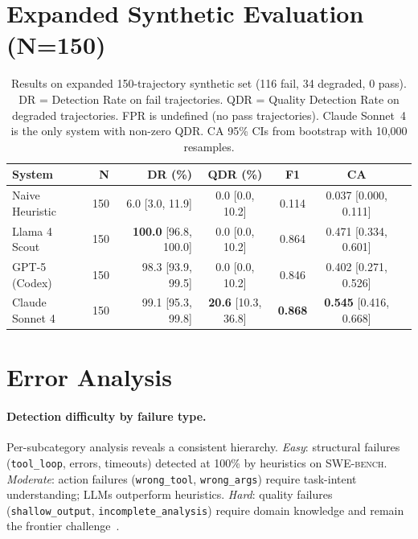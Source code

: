 \documentclass[11pt]{article}
\newcommand{\swebench}{\textsc{SWE-bench}\xspace}
\begin{document}
\section{Expanded Synthetic Evaluation (N=150)}
\label{app:synthetic_150}

\begin{table}[h]
\centering
\caption{Results on expanded 150-trajectory synthetic set (116 fail, 34
degraded, 0 pass). DR = Detection Rate on fail trajectories. QDR =
Quality Detection Rate on degraded trajectories. FPR is undefined (no
pass trajectories). Claude Sonnet~4 is the only system with non-zero QDR.
CA 95\% CIs from bootstrap with 10,000 resamples.}
\label{tab:synthetic_150}
\small
\begin{tabular}{@{}lrrcccl@{}}
\toprule
\textbf{System} & \textbf{N} & \textbf{DR (\%)} & \textbf{QDR (\%)} & \textbf{F1} & \textbf{CA} \\
\midrule
Naive Heuristic & 150 & 6.0 {\scriptsize [3.0, 11.9]} & 0.0 {\scriptsize [0.0, 10.2]} & 0.114 & 0.037 {\scriptsize [0.000, 0.111]} \\
Llama 4 Scout   & 150 & \textbf{100.0} {\scriptsize [96.8, 100.0]} & 0.0 {\scriptsize [0.0, 10.2]} & 0.864 & 0.471 {\scriptsize [0.334, 0.601]} \\
GPT-5 (Codex)   & 150 & 98.3 {\scriptsize [93.9, 99.5]} & 0.0 {\scriptsize [0.0, 10.2]} & 0.846 & 0.402 {\scriptsize [0.271, 0.526]} \\
Claude Sonnet 4 & 150 & 99.1 {\scriptsize [95.3, 99.8]} & \textbf{20.6} {\scriptsize [10.3, 36.8]} & \textbf{0.868} & \textbf{0.545} {\scriptsize [0.416, 0.668]} \\
\bottomrule
\end{tabular}
\end{table}

\section{Error Analysis}
\label{app:error_analysis}

\paragraph{Detection difficulty by failure type.}
Per-subcategory analysis reveals a consistent hierarchy.
\emph{Easy}: structural failures (\texttt{tool\_loop}, errors, timeouts)
detected at 100\% by heuristics on \swebench.
\emph{Moderate}: action failures (\texttt{wrong\_tool},
\texttt{wrong\_args}) require task-intent understanding; LLMs outperform
heuristics.
\emph{Hard}: quality failures (\texttt{shallow\_output},
\texttt{incomplete\_analysis}) require domain knowledge and remain the
frontier challenge~\citep{inkeep2025context, arize2024failures}.
\end{document}
